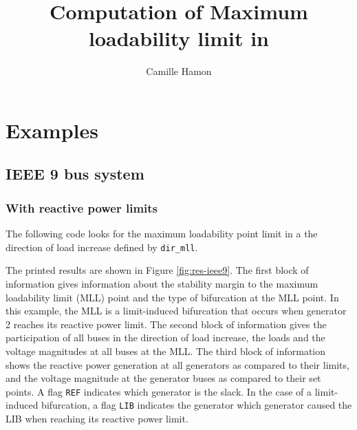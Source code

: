 \documentclass[12pt,a4]{article}
\title{Computation of Maximum loadability limit in \matpower{}}
\author{Camille Hamon}
\newcommand*{\codemat}[1]{\texttt{#1}}
\begin{document}
\maketitle

\tableofcontents

\section{Examples}
\label{sec:examples}

\subsection{IEEE 9 bus system}

\subsubsection{With reactive power limits}
\label{sec:with-reactive-power}

The following code looks for the maximum loadability point limit in a the direction of load increase defined by \codemat{dir\_mll}.



The printed results are shown in Figure \ref{fig:res-ieee9}. 
The first block of information gives information about the stability margin to the maximum loadability limit (MLL) point and the type of bifurcation at the MLL point. 
In this example, the MLL is a limit-induced bifurcation that occurs when generator 2 reaches its reactive power limit.
The second block of information gives the participation of all buses in the direction of load increase, the loads and the voltage magnitudes at all buses at the MLL. 
The third block of information shows the reactive power generation at all generators as compared to their limits, and the voltage magnitude at the generator buses as compared to their set points. 
A flag \codemat{REF} indicates which generator is the slack. 
In the case of a limit-induced bifurcation, a flag \codemat{LIB} indicates the generator which generator caused the LIB when reaching its reactive power limit.
\end{document}
